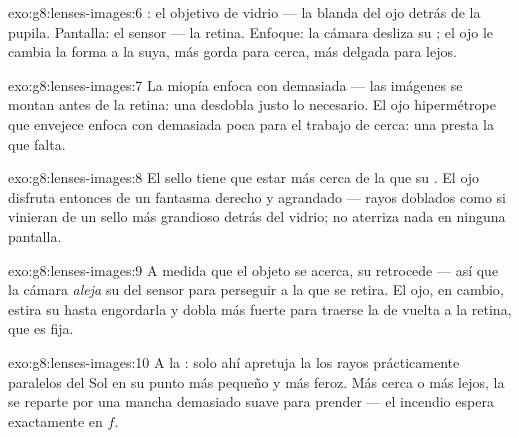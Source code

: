 \begin{solution}{exo:g8:lenses-images:6}
: el objetivo de vidrio --- la  blanda del ojo
detrás de la pupila. Pantalla: el sensor --- la retina. Enfoque: la
cámara desliza su ; el ojo le cambia la forma a la suya, más
gorda para cerca, más delgada para lejos.
\end{solution}

\begin{solution}{exo:g8:lenses-images:7}
La miopía enfoca con demasiada  --- las imágenes se montan
antes de la retina: una  desdobla justo lo
necesario. El ojo hipermétrope que envejece enfoca con demasiada poca
 para el trabajo de cerca: una  presta la
 que falta.
\end{solution}

\begin{solution}{exo:g8:lenses-images:8}
El sello tiene que estar más cerca de la  que su
. El ojo disfruta entonces de un fantasma derecho
y agrandado --- rayos doblados como si vinieran de un sello más
grandioso detrás del vidrio; no aterriza nada en ninguna pantalla.
\end{solution}

\begin{solution}{exo:g8:lenses-images:9}
A medida que el objeto se acerca, su  retrocede --- así que
la cámara \emph{aleja} su  del sensor para perseguir a la
 que se retira. El ojo, en cambio, estira su
 hasta engordarla y dobla más fuerte para traerse la
 de vuelta a la retina, que es fija.
\end{solution}

\begin{solution}{exo:g8:lenses-images:10}
A la : solo ahí apretuja la  los
rayos prácticamente paralelos del Sol en su punto más pequeño y más
feroz. Más cerca o más lejos, la  se reparte por una mancha
demasiado suave para prender --- el incendio espera exactamente en
$f$.
\end{solution}

